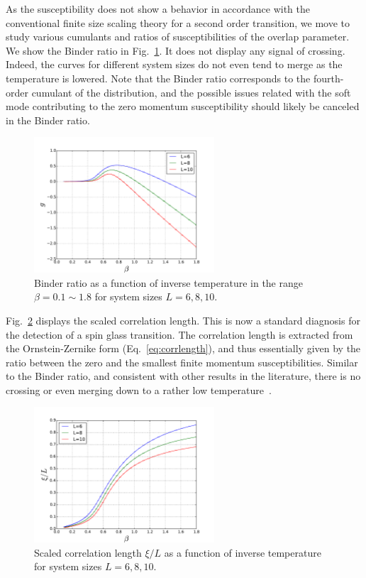 As the susceptibility does not show a behavior in accordance with the conventional 
finite size scaling theory for a second order transition, we move to study various 
cumulants and ratios of susceptibilities of the overlap parameter. We show the Binder ratio in Fig.~\ref{fig:Binder}. It does not display any signal of crossing. 
Indeed, the curves for different system sizes do not even tend to merge as the temperature 
is lowered.  Note that the Binder ratio corresponds to the fourth-order cumulant of the 
distribution, and 
the possible issues related with the soft mode  
contributing to the zero momentum susceptibility should likely be canceled in the Binder ratio.

\begin{figure}[ht]
\centering

\centering
  \includegraphics[width=0.6\textwidth]{img/binder.pdf}%
  \caption{\label{fig:b-h0} Binder ratio as a function of inverse temperature in the
range  $\beta=0.1\sim1.8$ for system sizes $L=6,8,10$.}
\label{fig:Binder}
\end{figure}

Fig.~\ref{fig:c-h0} displays the scaled correlation length. This is now a standard 
diagnosis for the detection of a spin glass transition. The correlation length is 
extracted from the Ornstein-Zernike form (Eq.~\ref{eq:corrlength}), and thus essentially given by the ratio 
between the zero and the smallest finite momentum susceptibilities. 
Similar to the Binder ratio, and consistent with other results in the literature, 
there is no crossing or even merging down to a rather low temperature~\cite{Young-Katzgraber2004}.

\begin{figure}[ht]
\centering

  \includegraphics[width=0.6\textwidth]{img/corr.pdf}%
  \caption{\label{fig:c-h0} Scaled correlation length $\xi/L$ as a function of inverse temperature for system sizes $L=6,8,10$.  }
\end{figure}

